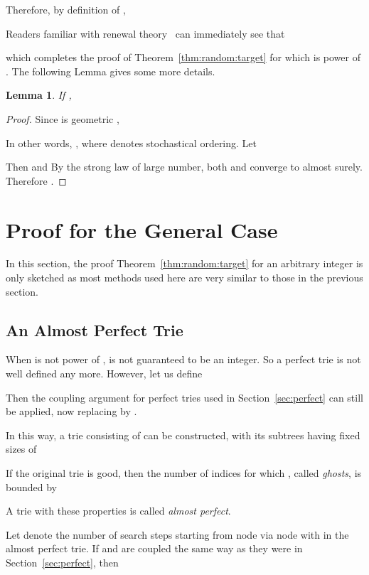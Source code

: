 \documentclass{article}
\newtheorem{lemma}{Lemma}
\begin{document}
Therefore, by definition of ,

Readers familiar with renewal theory~\citep[chap.\ 4.4]{Durrett2010probability}
can immediately see that

which completes the proof of Theorem~\ref{thm:random:target} for  which is
power of . The following Lemma gives some more details.
\begin{lemma}
    If ,
    
    \label{lem:convergence}
\end{lemma}
\begin{proof}
    Since  is geometric ,
    
    In other words, , where  denotes
    stochastical ordering.  
    Let 
    
    Then  and  By the strong law of large
    number, both  and  converge to  almost surely.
    Therefore .
\end{proof}

\section{Proof for the General Case}

\label{sec:general}

In this section, the proof Theorem~\ref{thm:random:target} for  an
arbitrary integer is only sketched as most methods used here are very similar
to those in the previous section.

\subsection{An Almost Perfect Trie}

When  is not power of ,  is not guaranteed
to be an integer. So a perfect trie is not well defined 
any more.  However, let us define

Then the coupling argument for perfect tries used in Section~\ref{sec:perfect}
can still be applied, now replacing  by .

In this way, a trie consisting of  can be constructed, with
its subtrees having fixed sizes of

If the original trie is good, then the number of indices  for which , called \emph{ghosts}, is
bounded by

A trie with these properties is called \emph{almost perfect}.

Let  denote the number of search steps starting from node  via node 
with  in the almost perfect trie. If  and  are
coupled  the same way as they were in Section~\ref{sec:perfect}, then
\end{document}
